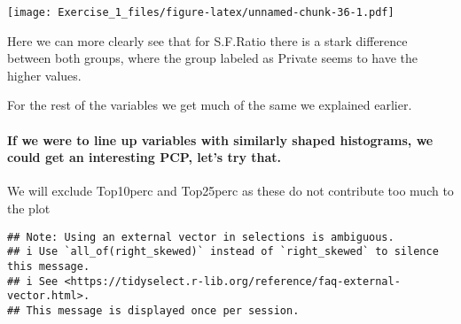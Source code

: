 \documentclass[]{article}
\newenvironment{Shaded}{\begin{snugshade}}{\end{snugshade}}
\newcommand{\CommentTok}[1]{\textcolor[rgb]{0.56,0.35,0.01}{\textit{#1}}}
\newcommand{\DataTypeTok}[1]{\textcolor[rgb]{0.13,0.29,0.53}{#1}}
\newcommand{\KeywordTok}[1]{\textcolor[rgb]{0.13,0.29,0.53}{\textbf{#1}}}
\newcommand{\NormalTok}[1]{#1}
\newcommand{\OperatorTok}[1]{\textcolor[rgb]{0.81,0.36,0.00}{\textbf{#1}}}
\newcommand{\OtherTok}[1]{\textcolor[rgb]{0.56,0.35,0.01}{#1}}
\newcommand{\StringTok}[1]{\textcolor[rgb]{0.31,0.60,0.02}{#1}}
\let\oldparagraph\paragraph
\renewcommand{\paragraph}[1]{\oldparagraph{#1}\mbox{}}
\begin{document}
\begin{Shaded}
\end{Shaded}

\texttt{[image: Exercise\_1\_files/figure-latex/unnamed-chunk-36-1.pdf]}

Here we can more clearly see that for S.F.Ratio there is a stark
difference between both groups, where the group labeled as Private seems
to have the higher values.

For the rest of the variables we get much of the same we explained
earlier.

\hypertarget{if-we-were-to-line-up-variables-with-similarly-shaped-histograms-we-could-get-an-interesting-pcp-lets-try-that.}{%
\paragraph{If we were to line up variables with similarly shaped
histograms, we could get an interesting PCP, let's try
that.}\label{if-we-were-to-line-up-variables-with-similarly-shaped-histograms-we-could-get-an-interesting-pcp-lets-try-that.}}

We will exclude Top10perc and Top25perc as these do not contribute too
much to the plot

\begin{Shaded}
\end{Shaded}

\begin{verbatim}
## Note: Using an external vector in selections is ambiguous.
## i Use `all_of(right_skewed)` instead of `right_skewed` to silence this message.
## i See <https://tidyselect.r-lib.org/reference/faq-external-vector.html>.
## This message is displayed once per session.
\end{verbatim}
\end{document}
